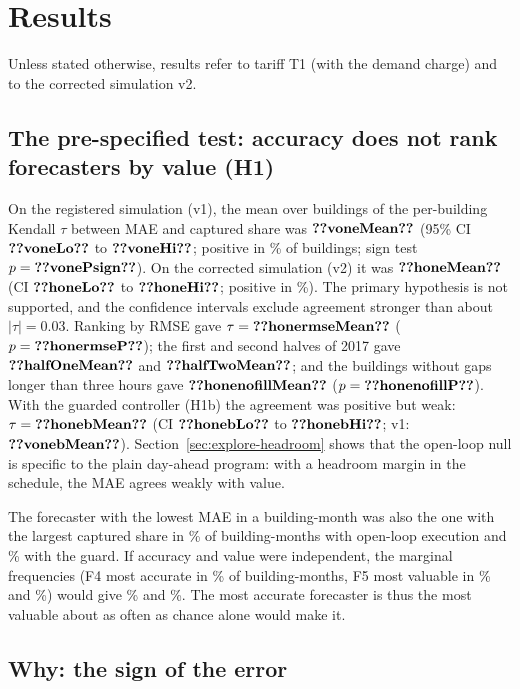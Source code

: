\section{Results}\label{sec:results}

Unless stated otherwise, results refer to tariff T1 (with the demand charge) and to the corrected simulation v2.

\subsection{The pre-specified test: accuracy does not rank forecasters by value (H1)}

On the registered simulation (v1), the mean over buildings of the per-building Kendall $\tau$ between MAE and captured share was $\res{voneMean}$ (95\% CI $\res{voneLo}$ to $\res{voneHi}$; positive in \% of buildings; sign test $p=\res{vonePsign}$). On the corrected simulation (v2) it was $\res{honeMean}$ (CI $\res{honeLo}$ to $\res{honeHi}$; positive in \%). The primary hypothesis is not supported, and the confidence intervals exclude agreement stronger than about $|\tau|=0.03$. Ranking by RMSE gave $\tau=\res{honermseMean}$ ($p=\res{honermseP}$); the first and second halves of 2017 gave $\res{halfOneMean}$ and $\res{halfTwoMean}$; and the  buildings without gaps longer than three hours gave $\res{honenofillMean}$ ($p=\res{honenofillP}$). With the guarded controller (H1b) the agreement was positive but weak: $\tau=\res{honebMean}$ (CI $\res{honebLo}$ to $\res{honebHi}$; v1: $\res{vonebMean}$). Section~\ref{sec:explore-headroom} shows that the open-loop null is specific to the plain day-ahead program: with a headroom margin in the schedule, the MAE agrees weakly with value.

The forecaster with the lowest MAE in a building-month was also the one with the largest captured share in \% of building-months with open-loop execution and \% with the guard. If accuracy and value were independent, the marginal frequencies (F4 most accurate in \% of building-months, F5 most valuable in \% and \%) would give \% and \%. The most accurate forecaster is thus the most valuable about as often as chance alone would make it.

\subsection{Why: the sign of the error}\label{sec:res-errors}

